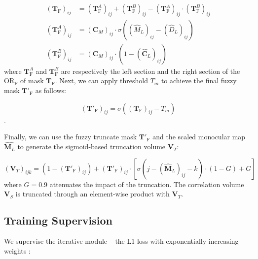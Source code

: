 \documentclass[10pt,twocolumn,letterpaper]{article}
\begin{document}
\small\begin{equation}
    \begin{split}
        (\mathbf{T}_\text{F})_{ij} &= (\mathbf{T}^A_\text{F})_{ij} + (\mathbf{T}^B_\text{F})_{ij} - (\mathbf{T}^A_\text{F})_{ij} \cdot (\mathbf{T}^B_\text{F})_{ij}\\
        (\mathbf{T}^A_\text{F})_{ij} &= (\mathbf{C}_M)_{ij} \cdot \sigma\left( (\hat{M}_L)_{ij} - (\hat{D}_L)_{ij} \right)\\
        (\mathbf{T}^B_\text{F})_{ij} &= (\mathbf{C}_M)_{ij} \cdot \left(1-(\hat{\mathbf{C}}_L)_{ij}\right)
    \end{split}
    \label{eq:truncate_mask_fuzzy}
\end{equation}\normalsize
where $\mathbf{T}^A_\text{F}$ and $\mathbf{T}^B_\text{F}$ are respectively the left section and the right section of the $\text{OR}_\text{F}$ of mask $\textbf{T}_\text{F}$.
Next, we can apply threshold $T_m$ to achieve the final fuzzy mask $\mathbf{T}'_\text{F}$ as follows:

\small\begin{equation}
    (\mathbf{T}'_\text{F})_{ij}=\sigma\left((\mathbf{T}_\text{F})_{ij}-T_m\right)
    \label{eq:truncate_mask_fuzzy_thresholded}
\end{equation}\normalsize.

Finally, we can use the fuzzy truncate mask $\mathbf{T}'_\text{F}$ and the scaled monocular map $\hat{\mathbf{M}_L}$ to generate the sigmoid-based truncation volume $\mathbf{V}_T$:

\small\begin{equation}
    (\mathbf{V}_T)_{ijk} = \left(1-(\mathbf{T}'_\text{F})_{ij}\right) + (\mathbf{T}'_\text{F})_{ij} \cdot \left[ \sigma\left(j - (\hat{\mathbf{M}}_L)_{ij} - k\right) \cdot (1-G) + G \right]
    \label{eq:truncate_vol}
\end{equation}\normalsize
where $G=0.9$ attenuates the impact of the truncation.
The correlation volume $\mathbf{V}_S$ is truncated through an element-wise product with $\mathbf{V}_T$.

\subsection{Training Supervision}
\label{subsec:training}

We supervise the iterative module  -- the L1 loss with exponentially increasing weights \cite{lipson2021raft}:
\end{document}

